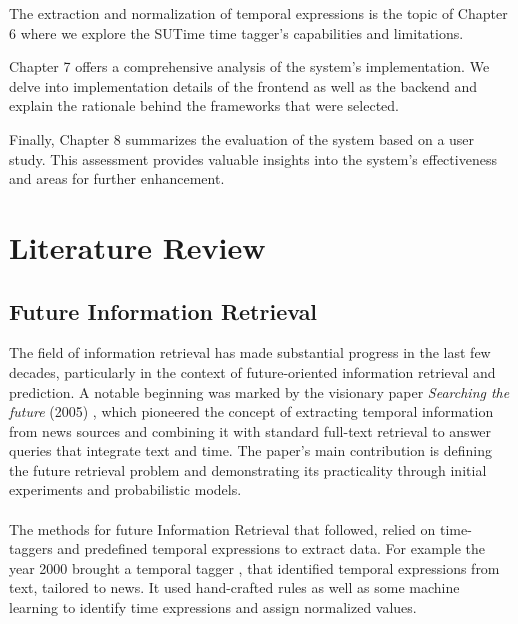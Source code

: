 \documentclass[a4paper,10pt]{report} %
\begin{document}
The extraction and normalization of temporal expressions is the topic of Chapter 6 where we explore the SUTime time tagger's capabilities and limitations.

Chapter 7 offers a comprehensive analysis of the system's implementation. We delve into implementation details of the frontend as well as the backend and explain the rationale behind the frameworks that were selected.

Finally, Chapter 8 summarizes the evaluation of the system based on a user study. This assessment provides valuable insights into the system's effectiveness and areas for further enhancement.



\chapter{Literature Review}

\section{Future Information Retrieval}
The field of information retrieval has made substantial progress in the last few decades, particularly in the context of future-oriented information retrieval and prediction. A notable beginning was marked by the visionary paper \textit{Searching the future} (2005) \cite{BaezaYatesSearchingTF}, which pioneered the concept of extracting temporal information from news sources and combining it with standard full-text retrieval to answer queries that integrate text and time. The paper's main contribution is defining the future retrieval problem and demonstrating its practicality through initial experiments and probabilistic models. 
\\\\
The methods for future Information Retrieval that followed, relied on time-taggers and predefined temporal expressions to extract data.
For example the year 2000 brought a temporal tagger \cite{ManiRobustTP}, that identified temporal expressions from text, tailored to news. It used hand-crafted rules as well as some machine learning to identify time expressions and assign normalized values.
\end{document}
